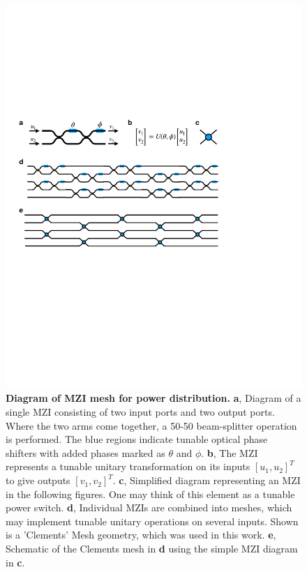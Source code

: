 \documentclass[%
 reprint,
 amsmath,amssymb,
 aps,
prstab,
floatfix,
]{revtex4-1}
\begin{document}
\begin{figure}
\includegraphics[width=1\columnwidth]{Fig2.pdf}
\caption{\label{fig:mesh} \textbf{Diagram of MZI mesh for power distribution.} \textbf{a}, Diagram of a single MZI consisting of two input ports and two output ports.  Where the two arms come together, a 50-50 beam-splitter operation is performed.  The blue regions indicate tunable optical phase shifters with added phases marked as $\theta$ and $\phi$.  \textbf{b}, The MZI represents a tunable unitary transformation on its inputs $[u_1, u_2]^T$ to give outputs $[v_1, v_2]^T$.  \textbf{c}, Simplified diagram representing an MZI in the following figures.  One may think of this element as a tunable power switch. \textbf{d}, Individual MZIs are combined into meshes, which may implement tunable unitary operations on several inputs.  Shown is a 'Clements' Mesh geometry, which was used in this work. \textbf{e}, Schematic of the Clements mesh in \textbf{d} using the simple MZI diagram in \textbf{c}.}
\end{figure}
\end{document}
